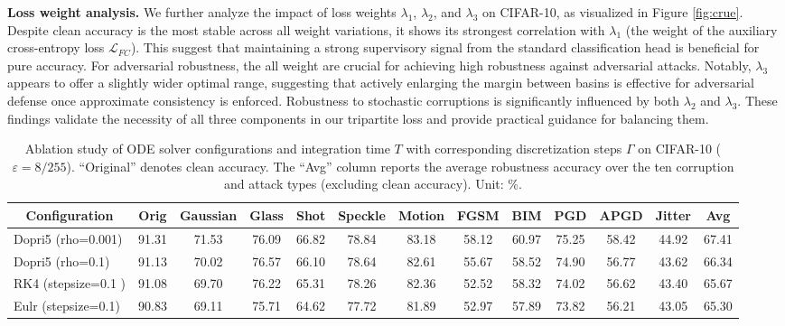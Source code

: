 \documentclass[journal]{IEEEtran}
\begin{document}
{\noindent \textbf{Loss weight analysis.} We further analyze the impact of loss weights $\lambda_1$, $\lambda_2$, and $\lambda_3$ on CIFAR-10, as visualized in Figure \ref{fig:crue}. Despite clean accuracy is the most stable across all weight variations, it shows its strongest correlation with $\lambda_1$ (the weight of the auxiliary cross-entropy loss $\mathcal{L}_{FC}$). This suggest that maintaining a strong supervisory signal from the standard classification head is beneficial for pure accuracy. For adversarial robustness, the all weight are crucial for achieving high robustness against adversarial attacks. Notably, $\lambda_3$ appears to offer a slightly wider optimal range, suggesting that actively enlarging the margin between basins is effective for adversarial defense once approximate consistency is enforced. Robustness to stochastic corruptions is significantly influenced by both $\lambda_2$ and $\lambda_3$. These findings validate the necessity of all three components in our tripartite loss and provide practical guidance for balancing them. 


\begin{table}[ht]
	\centering
	\caption{Ablation study of ODE solver configurations and integration time $T$ with corresponding discretization steps $\Gamma$ on CIFAR-10 ($\varepsilon=8/255$). ``Original'' denotes clean accuracy. The ``Avg'' column reports the average robustness accuracy over the ten corruption and attack types (excluding clean accuracy). Unit: \%.}
	\label{table:ab2}
	\begin{tabular}{lcccccccccccc}
		\toprule
		\multicolumn{1}{c}{\textbf{Configuration}} & \textbf{Orig} & \textbf{Gaussian} & \textbf{Glass} & \textbf{Shot} & \textbf{Speckle} & \textbf{Motion} & \textbf{FGSM} & \textbf{BIM} & \textbf{PGD} & \textbf{APGD} & \textbf{Jitter} & \textbf{Avg} \\\midrule
		Dopri5 (rho=0.001)                   & 91.31            & 71.53             & 76.09          & 66.82         & 78.84            & 83.18           & 58.12         & 60.97        & 75.25        & 58.42         & 44.92           & 67.41       \\
		Dopri5 (rho=0.1)                     & 91.13            & 70.02             & 76.57          & 66.10         & 78.64           & 82.61           & 55.67         & 58.52        & 74.90        & 56.77         & 43.62           & 66.34        \\
		RK4 (stepsize=0.1 )                 & 91.08            & 69.70             & 76.22          & 65.31         & 78.26           & 82.36           & 52.52         & 58.32        & 74.02        & 56.62         & 43.40           & 65.67        \\
		Eulr (stepsize=0.1)                 & 90.83            & 69.11             & 75.71          & 64.62         & 77.72            & 81.89           & 52.97         & 57.89        & 73.82        & 56.21         & 43.05           & 65.30     \\ \midrule 
		

\end{tabular}
\end{table}}
\end{document}
